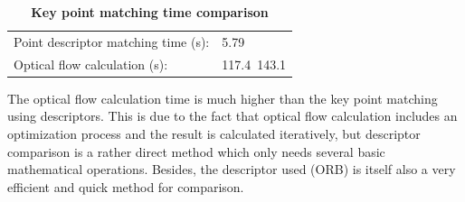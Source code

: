 \documentclass{easychair}
\begin{document}
\begin{table}
	\centering
	\caption{\textbf{Key point matching time comparison}}
	\label{tab:matching}
	\begin{tabular}{ll}
		Point descriptor matching time (s): &5.79\\
		Optical flow calculation (s): & 117.4~143.1   \\              
	\end{tabular}
\end{table}

The optical flow calculation time is much higher than the key point matching using descriptors. This is due to the fact that optical flow calculation includes an optimization process and the result is calculated iteratively, but descriptor comparison is a rather direct method which only needs several basic mathematical operations. Besides, the descriptor used (ORB) is itself also a very efficient and quick method for comparison.
\end{document}

